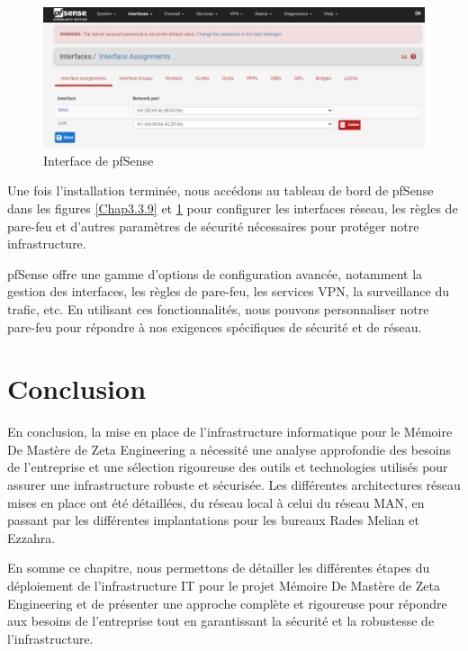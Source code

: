 \begin{figure}[H]
\centering
\includegraphics[width=15cm]{Images/BRadesMelian-Topologie15.png}
\caption{Interface de pfSense}
\label{Chap3.3.10}
\end{figure}

Une fois l'installation terminée, nous accédons au tableau de bord de pfSense dans les figures \ref{Chap3.3.9} et \ref{Chap3.3.10} pour configurer les interfaces réseau, les règles de pare-feu et d'autres paramètres de sécurité nécessaires pour protéger notre infrastructure.

pfSense offre une gamme d'options de configuration avancée, notamment la gestion des interfaces, les règles de pare-feu, les services VPN, la surveillance du trafic, etc. En utilisant ces fonctionnalités, nous pouvons personnaliser notre pare-feu pour répondre à nos exigences spécifiques de sécurité et de réseau.




\section{Conclusion}

En conclusion, la mise en place de l'infrastructure informatique pour le Mémoire De Mastère de Zeta Engineering a nécessité une analyse approfondie des besoins de l'entreprise et une sélection rigoureuse des outils et technologies utilisés pour assurer une infrastructure robuste et sécurisée. Les différentes architectures réseau mises en place ont été détaillées, du réseau local à celui du réseau MAN, en passant par les différentes implantations pour les bureaux Rades Melian et Ezzahra.


En somme ce chapitre, nous permettons de détailler les différentes étapes du déploiement de l'infrastructure IT pour le projet Mémoire De Mastère de Zeta Engineering et de présenter une approche complète et rigoureuse pour répondre aux besoins de l'entreprise tout en garantissant la sécurité et la robustesse de l'infrastructure. 